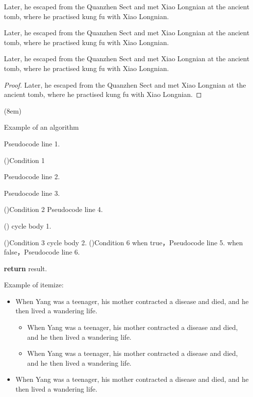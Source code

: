 \documentclass[doctor, vlined]{DissertUESTC}
\begin{document}
	\begin{Lemma}[Name]
		Later, he escaped from the Quanzhen Sect and met Xiao Longnian at the ancient tomb, where he practised kung fu with Xiao Longnian.
	\end{Lemma}

	\begin{Example}[Name]
		Later, he escaped from the Quanzhen Sect and met Xiao Longnian at the ancient tomb, where he practised kung fu with Xiao Longnian.
	\end{Example}

	\begin{Assumption}[Name]
		Later, he escaped from the Quanzhen Sect and met Xiao Longnian at the ancient tomb, where he practised kung fu with Xiao Longnian.
	\end{Assumption}
	
	\begin{proof}
		Later, he escaped from the Quanzhen Sect and met Xiao Longnian at the ancient tomb, where he practised kung fu with Xiao Longnian.
	\end{proof}
	

	\begin{algo}[!h](8em)
		\caption{Example of an algorithm}

		Pseudocode line 1.
		
		\For(){Condition 1}{
			Pseudocode line 2.
			
			Pseudocode line 3.
			
			\DoWhile(){Condition 2}{
				Pseudocode line 4.
			}
			
			\Loop(){
				cycle body 1.
			}
			
			\Repeat(){Condition 3}{
				cycle body 2.
			}
			\eIf(){Condition 6}{
				when true，Pseudocode line 5.
			}{
				when false，Pseudocode line 6.
			}
		}
		\textbf{return} result.
	\end{algo}
	

	Example of itemize:

	\begin{itemize}
		\item When Yang was a teenager, his mother contracted a disease and died, and he then lived a wandering life.
		\begin{itemize}
			\item When Yang was a teenager, his mother contracted a disease and died, and he then lived a wandering life.
			\item When Yang was a teenager, his mother contracted a disease and died, and he then lived a wandering life.
		\end{itemize}
		\item When Yang was a teenager, his mother contracted a disease and died, and he then lived a wandering life.
	\end{itemize}
\end{document}
